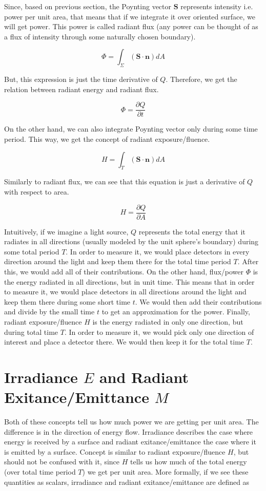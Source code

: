 \documentclass{article}
\begin{document}
Since, based on previous section, the Poynting vector $\mathbf{S}$ represents intensity i.e. power per unit area, that means that if we integrate it over oriented surface, we will get power. This power is called radiant flux (any power can be thought of as a flux of intensity through some naturally chosen boundary).

\[ \Phi = \int_{\Sigma} (\mathbf{S} \cdot \mathbf{n})dA \]

But, this expression is just the time derivative of $Q$. Therefore, we get the relation between radiant energy and radiant flux.

\[ \Phi = \frac{\partial Q}{\partial t} \]

On the other hand, we can also integrate Poynting vector only during some time period. This way, we get the concept of radiant exposure/fluence.

\[ H = \int_{T}(\mathbf{S} \cdot \mathbf{n})dA \]

Similarly to radiant flux, we can see that this equation is just a derivative of $Q$ with respect to area.

\[ H = \frac{\partial Q}{\partial A} \]

Intuitively, if we imagine a light source, $Q$ represents the total energy that it radiates in all directions (usually modeled by the unit sphere's boundary) during some total period $T$. In order to measure it, we would place detectors in every direction around the light and keep them there for the total time period $T$. After this, we would add all of their contributions. On the other hand, flux/power $\Phi$ is the energy radiated in all directions, but in unit time. This means that in order to measure it, we would place detectors in all directions around the light and keep them there during some short time $t$. We would then add their contributions and divide by the small time $t$ to get an approximation for the power. Finally, radiant exposure/fluence $H$ is the energy radiated in only one direction, but during total time $T$. In order to measure it, we would pick only one direction of interest and place a detector there. We would then keep it for the total time $T$.

\section{Irradiance $E$ and Radiant Exitance/Emittance $M$}

Both of these concepts tell us how much power we are getting per unit area. The difference is in the direction of energy flow. Irradiance describes the case where energy is received by a surface and radiant exitance/emittance the case where it is emitted by a surface. Concept is similar to radiant exposure/fluence $H$, but should not be confused with it, since $H$ tells us how much of the total energy (over total time period $T$) we get per unit area. More formally, if we see these quantities as scalars, irradiance and radiant exitance/emittance are defined as
\end{document}

